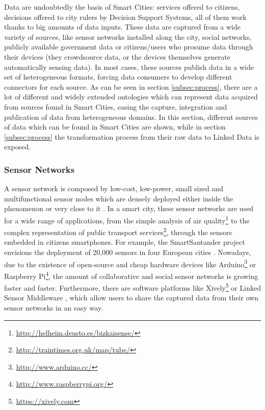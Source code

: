 Data are undoubtedly the basis of Smart Cities: services offered to citizens, decisions offered to city rulers by Decision Support Systems, all of them work thanks to big amounts of data inputs. These data are captured from a wide variety of sources, like sensor networks installed along the city, social networks, publicly available government data or citizens/users who prosume data through their devices (they crowdsource data, or the devices themselves generate automatically sensing data). In most cases, these sources publish data in a wide set of heterogeneous formats, forcing data consumers to develop different connectors for each source. As can be seen in section \ref{subsec:process}, there are a lot of different and widely extended ontologies which can represent data acquired from sources found in Smart Cities, easing the capture, integration and publication of data from heterogeneous domains. In this section, different sources of data which can be found in Smart Cities are shown, while in section \ref{subsec:process} the transformation process from their raw data to Linked Data is exposed.

\subsubsection{Sensor Networks}\label{sensor_networks}

A sensor network is composed by low-cost, low-power, small sized and multifunctional sensor nodes which are densely deployed either inside the phenomenon or very close to it \cite{akyildiz_survey_2002}. In a smart city, these sensor networks are used for a wide range of applications, from the simple analysis of air quality\footnote{\url{http://helheim.deusto.es/bizkaisense/}} to the complex representation of public transport services\footnote{\url{http://traintimes.org.uk/map/tube/}}, through the sensors embedded in citizens smartphones. For example, the SmartSantander project envisions the deployment of 20,000 sensors in four European cities \cite{sanchez_smartsantander:_2011}. Nowadays, due to the existence of open-source and cheap hardware devices like Arduino\footnote{\url{http://www.arduino.cc/}} or Raspberry Pi\footnote{\url{http://www.raspberrypi.org/}}, the amount of collaborative and social sensor networks is growing faster and faster. Furthermore, there are software platforms like Xively\footnote{\url{https://xively.com}} or Linked Sensor Middleware \cite{le-phuoc_linked_2011}, which allow users to share the captured data from their own sensor networks in an easy way.


